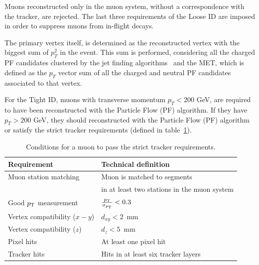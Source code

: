 Muons reconstructed only in the muon system, without a correspondence with the tracker, are rejected. The last three requirements of the Loose ID are imposed in order to suppress muons from in-flight decays.

The primary vertex itself, is determined as the reconstructed vertex with the biggest sum of $p_T^2$ in the event. This sum is performed, considering all the charged PF candidates clustered by the jet finding algorithms~\cite{Cacciari:2008gp,Cacciari:2011ma} and the MET, which is defined as the $p_T$ vector sum of all the charged and neutral PF candidates associated to that vertex. 

For the Tight ID, muons with transverse momentum $p_{T} < 200$ GeV, are required to have been reconstructed with the Particle Flow (PF) algorithm. If they have $p_{T} > 200$ GeV, they should reconstructed with the Particle Flow (PF) algorithm or satisfy the strict tracker requirements (defined in table~\ref{tab:Tracker_High_pT}).

\begin{table}[h]
    \begin{center}
    \begin{tabular}{l|l}
     \textbf{Requirement}         & \textbf{Technical definition}                 \\
      \hline
      Muon station matching          & Muon is matched to segments           \\
                                     & in at least two stations in the muon system        \\
      \hline                                                          
      Good $p_{\mathrm{T}}$ measurement         & $\frac{p_{\mathrm{T}}}{\sigma_{p_{\mathrm{T}}}} < 0.3$      \\
      \hline
      Vertex compatibility ($x-y$)   & $d_{xy} < 2$~mm                       \\
      \hline
      Vertex compatibility ($z$)     & $d_{z} < 5$~mm                        \\
      \hline
      Pixel hits                     & At least one pixel hit                \\
      \hline
      Tracker hits                   & Hits in at least six tracker layers   \\
      \hline
    \end{tabular}
    \caption{
      Conditions for a muon to pass the strict tracker requirements.
      }
    \label{tab:Tracker_High_pT}
    \end{center}
\end{table}



